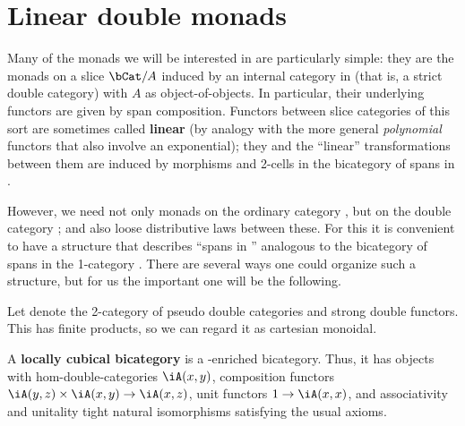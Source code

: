 \documentclass{amsart}
\begin{document}
\section{Linear double monads}
\label{sec:linear-double-monads}

Many of the monads we will be interested in are particularly simple: they are the monads on a slice $\bCat/A$ induced by an internal category in \bCat (that is, a strict double category) with $A$ as object-of-objects.
In particular, their underlying functors are given by span composition.
Functors between slice categories of this sort are sometimes called \textbf{linear} (by analogy with the more general \emph{polynomial} functors that also involve an exponential); they and the ``linear'' transformations between them are induced by morphisms and 2-cells in the bicategory of spans in \bCat.

However, we need not only monads on the ordinary category \bCat, but on the double category \dCat; and also loose distributive laws between these.
For this it is convenient to have a structure that describes ``spans in \dCat'' analogous to the bicategory of spans in the 1-category \bCat.
There are several ways one could organize such a structure, but for us the important one will be the following.

Let \cDbl denote the 2-category of pseudo double categories and strong double functors.
This has finite products, so we can regard it as cartesian monoidal.

\begin{defn}
  A \textbf{locally cubical bicategory} is a \cDbl-enriched bicategory.
  Thus, it has objects with hom-double-categories $\iA(x,y)$, composition functors $\iA(y,z)\times \iA(x,y) \to \iA(x,z)$, unit functors $1\to \iA(x,x)$, and associativity and unitality tight natural isomorphisms satisfying the usual axioms.
\end{defn}
\end{document}
